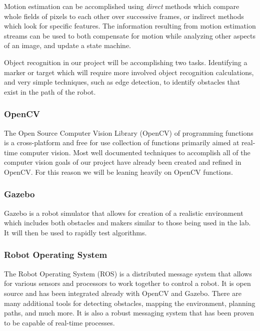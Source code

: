 \documentclass{article}
\begin{document}
		Motion estimation can be accomplished using \textit{direct} methods which compare whole fields of pixels to each other over successive frames, or indirect methods which look for specific features. The information resulting from motion estimation streams can be used to both compensate for motion while analyzing other aspects of an image, and update a state machine.
		
		Object recognition in our project will be accomplishing two tasks. Identifying a marker or target which will require more involved object recognition calculations, and very simple techniques, such as edge detection, to identify obstacles that exist in the path of the robot.
		
		\subsubsection{OpenCV}
		
		The Open Source Computer Vision Library (OpenCV) of programming functions is a cross-platform and free for use collection of functions primarily aimed at real-time computer vision\cite{opencv}. Most well documented techniques to accomplish all of the computer vision goals of our project have already been created and refined in OpenCV. For this reason we will be leaning heavily on OpenCV functions.
		
		\subsubsection{Gazebo}
		
		Gazebo is a robot simulator that allows for creation of a realistic environment which includes both obstacles and makers similar to those being used in the lab. It will then be used to rapidly test algorithms.
		
		\subsubsection{Robot Operating System}
		
		The Robot Operating System (ROS) is a distributed message system that allows for various sensors and processors to work together to control a robot. It is open source and has been integrated already with OpenCV and Gazebo. There are many additional tools for detecting obstacles, mapping the environment, planning paths, and much more. It is also a robust messaging system that has been proven to be capable of real-time processes.
		
\end{document}

